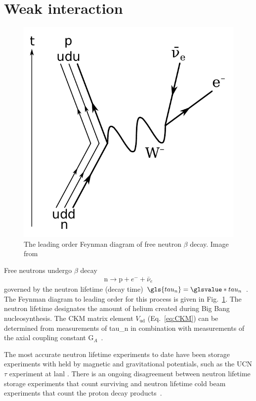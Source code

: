 \section{Weak interaction}\label{sec:weak_interaction}


\begin{figure}[htp]
    \centering
    \includegraphics[width=0.3 \textwidth]{figures/beta_negative_decay.pdf}
    \caption[The leading order Feynman diagram of free neutron $\beta$ decay]
    {The leading order  Feynman diagram of free neutron $\beta$ decay. Image from \cite{beta_decay_fig}}
    \label{fig:beta_decay}
\end{figure}

Free neutrons undergo $\beta$ decay
%
\begin{gather}
    \text{n}\rightarrow \text{p}+ e^-+\bar{\nu}_e
\end{gather}
%
governed by the neutron lifetime (decay time) $\gls{tau_n}=\glsvalue*{tau_n}$ \cite{pdg2022}. The Feynman diagram to leading order for this process is given in Fig.~\ref{fig:beta_decay}. The neutron lifetime designates the amount of helium created during Big Bang nucleosynthesis. The CKM matrix element $V_\text{ud}$ (Eq.~\ref{eq:CKM}) can be determined from measurements of \gls{tau_n} in combination with measurements of the axial coupling constant G$_A$~\cite{Young2014}.

The most accurate neutron lifetime experiments to date have been storage experiments with \ucn held by magnetic and gravitational potentials, such as the UCN$\tau$ experiment at \acrshort{lanl} \cite{gonzalez_ucn_tau}. There is an ongoing disagreement between neutron lifetime storage experiments that count surviving \ucn and neutron lifetime cold beam experiments that count the proton decay products~\cite{czarnecki2018}.

